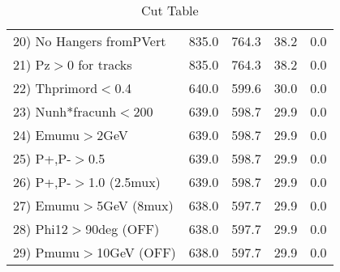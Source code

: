 \begin{table}[h!]
\begin{tabular}{||l||r|r|r|r||}
 20) No Hangers fromPVert &       835.0 &       764.3 &        38.2 &         0.0 \\
 21) Pz$>$0 for tracks    &       835.0 &       764.3 &        38.2 &         0.0 \\
 22) Thprimord$<$0.4      &       640.0 &       599.6 &        30.0 &         0.0 \\
 23) Nunh*fracunh$<$200   &       639.0 &       598.7 &        29.9 &         0.0 \\
 24) Emumu$>$2GeV         &       639.0 &       598.7 &        29.9 &         0.0 \\
 25) P+,P-$>$0.5          &       639.0 &       598.7 &        29.9 &         0.0 \\
 26) P+,P-$>$1.0 (2.5mux) &       639.0 &       598.7 &        29.9 &         0.0 \\
 27) Emumu$>$5GeV  (8mux) &       638.0 &       597.7 &        29.9 &         0.0 \\
 28) Phi12$>$90deg  (OFF) &       638.0 &       597.7 &        29.9 &         0.0 \\
 29) Pmumu$>$10GeV  (OFF) &       638.0 &       597.7 &        29.9 &         0.0 \\
 \hline
 \hline
 \end{tabular}
 \caption{Cut Table \cohrp  }
 \label{tab-cut_crhop}
 \end{table}
